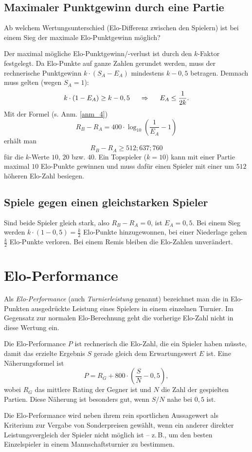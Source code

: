 \subsection{Maximaler Punktgewinn durch eine Partie}

Ab welchem Wertungsunterschied (Elo-Differenz zwischen den Spielern) ist bei einem Sieg der maximale Elo-Punktgewinn möglich?

Der maximal mögliche Elo-Punktgewinn/-verlust ist durch den $k$-Faktor festgelegt. Da Elo-Punkte auf ganze Zahlen gerundet werden, muss der rechnerische Punktgewinn $k \cdot (S_{A} - E_{A})$ mindestens $k - 0,5$ betragen. Demnach muss gelten (wegen $S_{A} = 1$):
\[
    k \cdot (1 - E_{A}) \geq k - 0,5 \hspace{0,5cm} \Rightarrow \hspace{0,5cm} E_{A} \leq \frac{1}{2k}.
\]
Mit der Formel (s. Anm. \ref{anm_4})
\[
    R_{B} - R_{A} = 400 \cdot \log_{10} (\frac{1}{E_{A}} - 1)
\]
erhält man
\[
    R_{B} - R_{A} \geq 512; 637; 760
\]
für die $k$-Werte $10$, $20$ bzw. $40$. Ein Topspieler ($k = 10$) kann mit einer Partie maximal $10$ Elo-Punkte gewinnen und muss dafür einen Spieler mit einer um $512$ höheren Elo-Zahl besiegen.


\subsection{Spiele gegen einen gleichstarken Spieler}

Sind beide Spieler gleich stark, also $R_{B} - R_{A} = 0$, ist $E_{A} = 0,5$. Bei einem Sieg werden $k \cdot (1 - 0,5) = \frac{k}{2}$ Elo-Punkte hinzugewonnen, bei einer Niederlage gehen $\frac{k}{2}$ Elo-Punkte verloren. Bei einem Remis bleiben die Elo-Zahlen unverändert.


\section{Elo-Performance}

Als \textit{Elo-Performance} (auch \textit{Turnierleistung} genannt) bezeichnet man die in Elo-Punkten ausgedrückte Leistung eines Spielers in einem einzelnen Turnier. Im Gegensatz zur normalen Elo-Berechnung geht die vorherige Elo-Zahl nicht in diese Wertung ein.

Die Elo-Performance $P$ ist rechnerisch die Elo-Zahl, die ein Spieler haben müsste, damit das erzielte Ergebnis $S$ gerade gleich dem Erwartungswert $E$ ist. Eine Näherungsformel ist
\[
    P = R_{G} + 800 \cdot (\frac{S}{N} - 0,5),
\]
wobei $R_{G}$ das mittlere Rating der Gegner ist und $N$ die Zahl der gespielten Partien. Diese Näherung ist besonders gut, wenn $S/N$ nahe bei $0,5$ ist.

Die Elo-Performance wird neben ihrem rein sportlichen Aussagewert als Kriterium zur Vergabe von Sonderpreisen gewählt, wenn ein anderer direkter Leistungsvergleich der Spieler nicht möglich ist -- z.\,B., um den besten Einzelspieler in einem Mannschaftsturnier zu bestimmen.